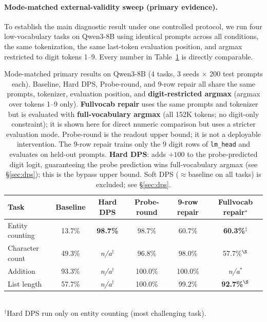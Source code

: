 \documentclass{article}
\begin{document}
\paragraph{Mode-matched external-validity sweep (primary evidence).}
\label{sec:dps_extval}%
To establish the main diagnostic result under one controlled protocol, we run
four low-vocabulary tasks on Qwen3-8B using identical prompts across all conditions,
the same tokenization, the same last-token evaluation position, and argmax restricted
to digit tokens 1--9. Every number in Table~\ref{tab:mode_matched_extval} is
directly comparable.

\begin{table}[t]
\centering
\small
\caption{Mode-matched primary results on Qwen3-8B (4 tasks, 3 seeds $\times$ 200 test prompts each). Baseline, Hard DPS, Probe-round, and 9-row repair all share the same prompts, tokenizer, evaluation position, and \textbf{digit-restricted argmax} (argmax over tokens 1--9 only). \textbf{Fullvocab repair} uses the same prompts and tokenizer but is evaluated with \textbf{full-vocabulary argmax} (all 152K tokens; no digit-only constraint); it is shown here for direct numeric comparison but uses a stricter evaluation mode. Probe-round is the readout upper bound; it is not a deployable intervention. The 9-row repair trains only the 9 digit rows of \texttt{lm\_head} and evaluates on held-out prompts. \textbf{Hard DPS}: adds $+100$ to the probe-predicted digit logit, guaranteeing the probe prediction wins full-vocabulary argmax (see \S\ref{sec:dps}); this is the bypass upper bound. Soft DPS ($\approx$baseline on all tasks) is excluded; see \S\ref{sec:dps}.}
\label{tab:mode_matched_extval}
\begin{tabular}{lccccc}
\toprule
Task & Baseline & Hard DPS & Probe-round & 9-row repair & Fullvocab repair$^\star$ \\
\midrule
Entity counting & 13.7\% & \textbf{98.7\%} & 98.7\% & 60.7\% & \textbf{60.3\%}$^{\ddagger}$ \\
Character count & 49.3\% & \emph{n/a}$^\dagger$ & 96.8\% & 98.0\% & 57.7\%$^{\S}$ \\
Addition & 93.3\% & \emph{n/a}$^\dagger$ & 100.0\% & 100.0\% & \emph{n/a}$^{\ast}$ \\
List length & 57.7\% & \emph{n/a}$^\dagger$ & 100.0\% & 99.2\% & \textbf{92.7\%}$^{\S}$ \\
\bottomrule
\end{tabular}
\\[2pt]
\footnotesize $^\dagger$Hard DPS run only on entity counting (most challenging task).\\

\end{table}
\end{document}
